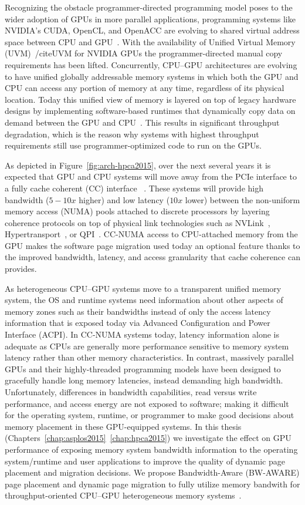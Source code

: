 Recognizing the obstacle programmer-directed programming model poses to the
wider adoption of GPUs in more parallel applications, programming systems like
NVIDIA's CUDA, OpenCL, and OpenACC are evolving to shared virtual address space
between CPU and GPU~\cite{UVM}. With the availability of Unified Virtual Memory
(UVM)~/cite{UVM} for NVIDIA GPUs the programmer-directed manual copy
requirements has been lifted.  Concurrently, CPU--GPU architectures are evolving
to have unified globally addressable memory systems in which both the GPU and
CPU can access any portion of memory at any time, regardless of its physical
location.  Today this unified view of memory is layered on top of legacy
hardware designs by implementing software-based runtimes that dynamically copy
data on demand between the GPU and CPU~\cite{cuda}. This results in significant
throughput degradation, which is the reason why systems with highest throughput
requirements still use programmer-optimized code to run on the GPUs.

As depicted in Figure~\ref{fig:arch-hpca2015}, over the next several years it is
expected that GPU and CPU systems will move away from the PCIe interface to a
fully cache coherent (CC) interface ~\cite{AMDHSA}. These systems will provide
high bandwidth ($5-10x$ higher) and low latency ($10x$ lower) between the
non-uniform memory access (NUMA) pools attached to discrete processors by
layering coherence protocols on top of physical link technologies such as
NVLink~\cite{NVLINK}, Hypertransport~\cite{AMDHT}, or QPI~\cite{INTELQPI}.
CC-NUMA access to CPU-attached memory from the GPU makes the software page
migration used today an optional feature thanks to the improved bandwidth,
latency, and access granularity that cache coherence can provides.

As heterogeneous CPU--GPU systems move to a transparent unified memory system,
the OS and runtime systems need information about other aspects of memory zones
such as their bandwidths instead of only the access latency information that is
exposed today via Advanced Configuration and Power Interface (ACPI). In CC-NUMA
systems today, latency information alone is adequate as CPUs are generally more
performance sensitive to memory system latency rather than other memory
characteristics. In contrast, massively parallel GPUs and their highly-threaded
programming models have been designed to gracefully handle long memory
latencies, instead demanding high bandwidth. Unfortunately, differences in
bandwidth capabilities, read versus write performance, and access energy are not
exposed to software; making it difficult for the operating system, runtime, or
programmer to make good decisions about memory placement in these GPU-equipped
systems. In this thesis (Chapters~\ref{chap:asplos2015}~\ref{chap:hpca2015}) we
investigate the effect on GPU performance of exposing memory system bandwidth
information to the operating system/runtime and user applications to improve the
quality of dynamic page placement and migration decisions. We propose
Bandwidth-Aware (BW-AWARE) page placement and dynamic page migration to fully
utilize memory bandwith for throughput-oriented CPU--GPU heterogeneous memory
systems~\cite{ref:agarwal:hpca2015,ref:agarwal:asplos2015}.


